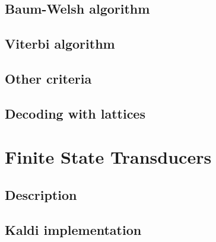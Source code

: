 \subsection{Baum-Welsh algorithm}
\label{sub:baum_welsh_algorithm}




\subsection{Viterbi algorithm}
\label{sub:viterbi_algorithm}


\subsection{Other criteria}
\label{sub:other_criteria}


\subsection{Decoding with lattices}
\label{sub:lattice}





\section{Finite State Transducers} 
\label{sec:fst}

\subsection{Description}
\label{sub:description}


\subsection{Kaldi implementation} %
\label{sec:kaldi}


